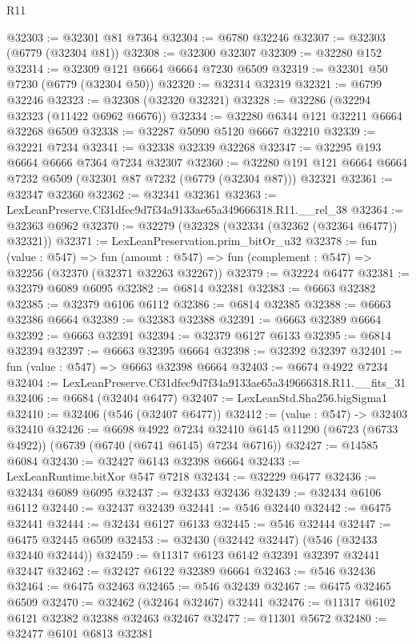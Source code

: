 \begin{lexlean}{R11}
\begin{coremodule}
@32303 := @32301 @81 @7364
@32304 := @6780 @32246
@32307 := @32303 (@6779 (@32304 @81))
@32308 := @32300 @32307
@32309 := @32280 @152
@32314 := @32309 @121 @6664 @6664 @7230 @6509
@32319 := @32301 @50 @7230 (@6779 (@32304 @50))
@32320 := @32314 @32319
@32321 := @6799 @32246
@32323 := @32308 (@32320 @32321)
@32328 := @32286 (@32294 @32323 (@11422 @6962 @6676))
@32334 := @32280 @6344 @121 @32211 @6664 @32268 @6509
@32338 := @32287 @5090 @5120 @6667 @32210
@32339 := @32221 @7234
@32341 := @32338 @32339 @32268
@32347 := @32295 @193 @6664 @6666 @7364 @7234 @32307
@32360 := @32280 @191 @121 @6664 @6664 @7232 @6509 (@32301 @87 @7232 (@6779 (@32304 @87))) @32321
@32361 := @32347 @32360
@32362 := @32341 @32361
@32363 := LexLeanPreserve.Cf31dfec9d7f34a9133ae65a349666318.R11.__rel_38
@32364 := @32363 @6962
@32370 := @32279 (@32328 (@32334 (@32362 (@32364 @6477)) @32321))
@32371 := LexLeanPreservation.prim_bitOr_u32
@32378 := fun (value : @547) =>
  fun (amount : @547) => fun (complement : @547) => @32256 (@32370 (@32371 @32263 @32267))
@32379 := @32224 @6477
@32381 := @32379 @6089 @6095
@32382 := @6814 @32381
@32383 := @6663 @32382
@32385 := @32379 @6106 @6112
@32386 := @6814 @32385
@32388 := @6663 @32386 @6664
@32389 := @32383 @32388
@32391 := @6663 @32389 @6664
@32392 := @6663 @32391
@32394 := @32379 @6127 @6133
@32395 := @6814 @32394
@32397 := @6663 @32395 @6664
@32398 := @32392 @32397
@32401 := fun (value : @547) => @6663 @32398 @6664
@32403 := @6674 @4922 @7234
@32404 := LexLeanPreserve.Cf31dfec9d7f34a9133ae65a349666318.R11.__fits_31
@32406 := @6684 (@32404 @6477)
@32407 := LexLeanStd.Sha256.bigSigma1
@32410 := @32406 (@546 (@32407 @6477))
@32412 := (value : @547) -> @32403 @32410
@32426 := @6698
    @4922
    @7234
    @32410
    @6145
    @11290
    (@6723 (@6733 @4922))
    (@6739 (@6740 (@6741 @6145) @7234 @6716))
@32427 := @14585 @6084
@32430 := @32427 @6143 @32398 @6664
@32433 := LexLeanRuntime.bitXor @547 @7218
@32434 := @32229 @6477
@32436 := @32434 @6089 @6095
@32437 := @32433 @32436
@32439 := @32434 @6106 @6112
@32440 := @32437 @32439
@32441 := @546 @32440
@32442 := @6475 @32441
@32444 := @32434 @6127 @6133
@32445 := @546 @32444
@32447 := @6475 @32445 @6509
@32453 := @32430 (@32442 @32447) (@546 (@32433 @32440 @32444))
@32459 := @11317 @6123 @6142 @32391 @32397 @32441 @32447
@32462 := @32427 @6122 @32389 @6664
@32463 := @546 @32436
@32464 := @6475 @32463
@32465 := @546 @32439
@32467 := @6475 @32465 @6509
@32470 := @32462 (@32464 @32467) @32441
@32476 := @11317 @6102 @6121 @32382 @32388 @32463 @32467
@32477 := @11301 @5672
@32480 := @32477 @6101 @6813 @32381

\end{coremodule}
\end{lexlean}
